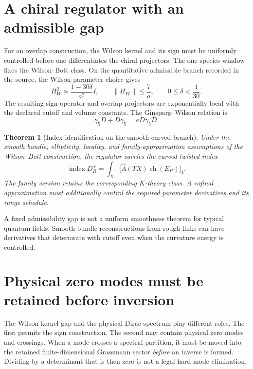 \documentclass[11pt,a4paper,oneside]{book}
\theoremstyle{plain}
\newtheorem{theorem}{Theorem}[chapter]
\theoremstyle{definition}
\theoremstyle{remark}
\newcommand{\norm}[1]{\left\lVert#1\right\rVert}
\newcommand{\src}[2]{\cite{#1}}
\begin{document}
\section{A chiral regulator with an admissible gap}
For an overlap construction, the Wilson kernel and its sign must be uniformly controlled before one differentiates the chiral projectors. The one-species window fixes the Wilson--Bott class. On the quantitative admissible branch recorded in the source, the Wilson parameter choice gives
\begin{equation}
 H_W^2\succeq\frac{1-30\delta}{a^2}I,
 \qquad \norm{H_W}\le\frac7a,
 \qquad 0\le\delta<\frac1{30}.
 \label{eq:wilson-gap}
\end{equation}
The resulting sign operator and overlap projectors are exponentially local with the declared cutoff and volume constants. The Ginsparg--Wilson relation is
\begin{equation}
 \gamma_5D+D\gamma_5=aD\gamma_5D.
 \label{eq:gw}
\end{equation}
\cite{R3,R6}

\begin{theorem}[Index identification on the smooth curved branch]
\label{thm:curved-index}
Under the smooth bundle, ellipticity, locality, and family-approximation assumptions of the Wilson--Bott construction, the regulator carries the curved twisted index
\begin{equation}
 \operatorname{index}D_R^+
 =\int_X\bigl[\widehat A(TX)\operatorname{ch}(E_R)\bigr]_4.
 \label{eq:curved-index}
\end{equation}
The family version retains the corresponding $K$-theory class. A cofinal approximation must additionally control the required parameter derivatives and its range schedule.
\end{theorem}
\src{R3}{thm:v3v92-curved-index,thm:v3v92-global-Thom}
A fixed admissibility gap is not a uniform smoothness theorem for typical quantum fields. Smooth bundle reconstructions from rough links can have derivatives that deteriorate with cutoff even when the curvature energy is controlled.

\section{Physical zero modes must be retained before inversion}
The Wilson-kernel gap and the physical Dirac spectrum play different roles. The first permits the sign construction. The second may contain physical zero modes and crossings. When a mode crosses a spectral partition, it must be moved into the retained finite-dimensional Grassmann sector \emph{before} an inverse is formed. Dividing by a determinant that is then zero is not a legal hard-mode elimination.
\end{document}
